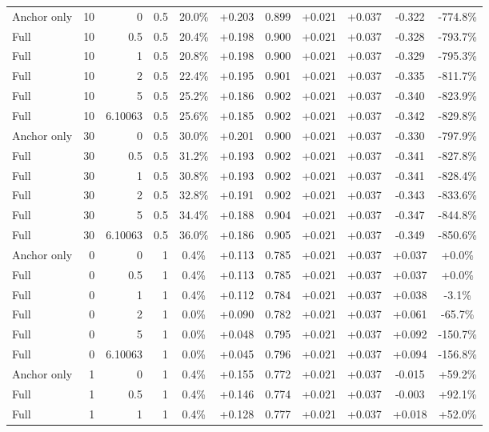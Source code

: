 \begin{table}[htbp]
\begin{tabular}{lrrrccccccc}
Anchor only & 10 & 0 & 0.5 & 20.0\% & +0.203 & 0.899 & +0.021 & +0.037 & -0.322 & -774.8\% \\
Full & 10 & 0.5 & 0.5 & 20.4\% & +0.198 & 0.900 & +0.021 & +0.037 & -0.328 & -793.7\% \\
Full & 10 & 1 & 0.5 & 20.8\% & +0.198 & 0.900 & +0.021 & +0.037 & -0.329 & -795.3\% \\
Full & 10 & 2 & 0.5 & 22.4\% & +0.195 & 0.901 & +0.021 & +0.037 & -0.335 & -811.7\% \\
Full & 10 & 5 & 0.5 & 25.2\% & +0.186 & 0.902 & +0.021 & +0.037 & -0.340 & -823.9\% \\
Full & 10 & 6.10063 & 0.5 & 25.6\% & +0.185 & 0.902 & +0.021 & +0.037 & -0.342 & -829.8\% \\
Anchor only & 30 & 0 & 0.5 & 30.0\% & +0.201 & 0.900 & +0.021 & +0.037 & -0.330 & -797.9\% \\
Full & 30 & 0.5 & 0.5 & 31.2\% & +0.193 & 0.902 & +0.021 & +0.037 & -0.341 & -827.8\% \\
Full & 30 & 1 & 0.5 & 30.8\% & +0.193 & 0.902 & +0.021 & +0.037 & -0.341 & -828.4\% \\
Full & 30 & 2 & 0.5 & 32.8\% & +0.191 & 0.902 & +0.021 & +0.037 & -0.343 & -833.6\% \\
Full & 30 & 5 & 0.5 & 34.4\% & +0.188 & 0.904 & +0.021 & +0.037 & -0.347 & -844.8\% \\
Full & 30 & 6.10063 & 0.5 & 36.0\% & +0.186 & 0.905 & +0.021 & +0.037 & -0.349 & -850.6\% \\
Anchor only & 0 & 0 & 1 & 0.4\% & +0.113 & 0.785 & +0.021 & +0.037 & +0.037 & +0.0\% \\
Full & 0 & 0.5 & 1 & 0.4\% & +0.113 & 0.785 & +0.021 & +0.037 & +0.037 & +0.0\% \\
Full & 0 & 1 & 1 & 0.4\% & +0.112 & 0.784 & +0.021 & +0.037 & +0.038 & -3.1\% \\
Full & 0 & 2 & 1 & 0.0\% & +0.090 & 0.782 & +0.021 & +0.037 & +0.061 & -65.7\% \\
Full & 0 & 5 & 1 & 0.0\% & +0.048 & 0.795 & +0.021 & +0.037 & +0.092 & -150.7\% \\
Full & 0 & 6.10063 & 1 & 0.0\% & +0.045 & 0.796 & +0.021 & +0.037 & +0.094 & -156.8\% \\
Anchor only & 1 & 0 & 1 & 0.4\% & +0.155 & 0.772 & +0.021 & +0.037 & -0.015 & +59.2\% \\
Full & 1 & 0.5 & 1 & 0.4\% & +0.146 & 0.774 & +0.021 & +0.037 & -0.003 & +92.1\% \\
Full & 1 & 1 & 1 & 0.4\% & +0.128 & 0.777 & +0.021 & +0.037 & +0.018 & +52.0\% \\

\end{tabular}
\end{table}
